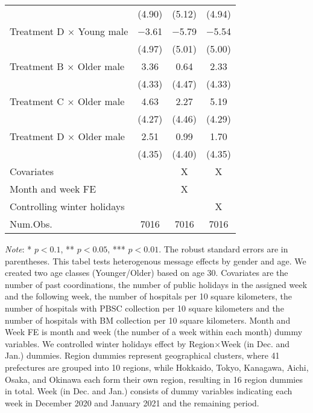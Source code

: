 \documentclass[12pt, a4paper]{article}
\begin{document}
\begin{table}[H]
\begin{threeparttable}
\begin{tabular}[t]{lccc}
 & (\num{4.90}) & (\num{5.12}) & (\num{4.94})\\
Treatment D $\times$ Young male & \num{-3.61} & \num{-5.79} & \num{-5.54}\\
 & (\num{4.97}) & (\num{5.01}) & (\num{5.00})\\
Treatment B $\times$ Older male & \num{3.36} & \num{0.64} & \num{2.33}\\
 & (\num{4.33}) & (\num{4.47}) & (\num{4.33})\\
Treatment C $\times$ Older male & \num{4.63} & \num{2.27} & \num{5.19}\\
 & (\num{4.27}) & (\num{4.46}) & (\num{4.29})\\
Treatment D $\times$ Older male & \num{2.51} & \num{0.99} & \num{1.70}\\
 & (\num{4.35}) & (\num{4.40}) & (\num{4.35})\\
\midrule
Covariates &  & X & X\\
Month and week FE &  & X & \\
Controlling winter holidays &  &  & X\\
Num.Obs. & \num{7016} & \num{7016} & \num{7016}\\
\bottomrule
\end{tabular}
\begin{tablenotes}
\item \emph{Note}: * $p < 0.1$, ** $p < 0.05$, *** $p < 0.01$. The robust standard errors are in parentheses. This tabel tests heterogenous message effects by gender and age. We created two age classes (Younger/Older) based on age 30. Covariates are the number of past coordinations, the number of public holidays in the assigned week and the following week, the number of hospitals per 10 square kilometers, the number of hospitals with PBSC collection per 10 square kilometers and the number of hospitals with BM collection per 10 square kilometers. Month and Week FE is month and week (the number of a week within each month) dummy variables. We controlled winter holidays effect by Region$\times$Week (in Dec. and Jan.) dummies. Region dummies represent geographical clusters, where 41 prefectures are grouped into 10 regions, while Hokkaido, Tokyo, Kanagawa, Aichi, Osaka, and Okinawa each form their own region, resulting in 16 region dummies in total. Week (in Dec. and Jan.) consists of dummy variables indicating each week in December 2020 and January 2021 and the remaining period.
\end{tablenotes}
\end{threeparttable}
\end{table}
\end{document}
